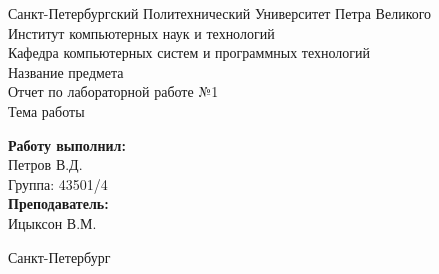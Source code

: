 


\begin{titlepage}	%

	\begin{center}		%

		\large Санкт-Петербургский Политехнический Университет Петра Великого\\
		\large Институт компьютерных наук и технологий \\
		\large Кафедра компьютерных систем и программных технологий\\[6cm]
		
		\huge Название предмета\\[0.5cm] %
		\large Отчет по лабораторной работе №1\\[0.1cm]
		\large Тема работы\\[5cm]

	\end{center}


	\begin{flushright} %
		\begin{minipage}{0.25\textwidth} %
			\begin{flushleft} %

				\large\textbf{Работу выполнил:}\\
				\large Петров В.Д.\\
				\large {Группа:} 43501/4\\
				
				\large \textbf{Преподаватель:}\\
				\large Ицыксон В.М.

			\end{flushleft}
		\end{minipage}
	\end{flushright}
	
	\vfill %

	\begin{center}
	\large Санкт-Петербург\\
	\large \the\year %
	\end{center} %

\thispagestyle{empty} %
\end{titlepage} %

